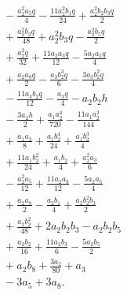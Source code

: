 \begin{align*}
&{}- \frac{a_{2}^{2} a_{5} q}{4} - \frac{11 a_{2}^{2} b_{1} q}{24} + \frac{a_{2}^{2} b_{2} b_{3} q}{2}\\
&{}+ \frac{a_{2}^{2} b_{2} q}{48} + a_{2}^{2} b_{3} q - \frac{a_{2}^{2} b_{5} q}{2}\\
&{}+ \frac{a_{2}^{2} q}{32} + \frac{11 a_{2} a_{3} q}{12} - \frac{5 a_{2} a_{5} q}{4}\\
&{}+ \frac{a_{2} a_{8} q}{2} - \frac{a_{3} b_{2}^{3} q}{6} - \frac{3 a_{3} b_{2}^{2} q}{4}\\
&{}- \frac{11 a_{3} b_{2} q}{12} - \frac{a_{3} q}{4} - a_{2} b_{2} h\\
&{}- \frac{3 a_{2} h}{2} + \frac{a_{1} a_{2}^{4}}{720} - \frac{11 a_{1} a_{2}^{2}}{144}\\
&{}+ \frac{a_{1} a_{2}}{8} + \frac{a_{1} b_{2}^{4}}{24} + \frac{a_{1} b_{2}^{3}}{4}\\
&{}+ \frac{11 a_{1} b_{2}^{2}}{24} + \frac{a_{1} b_{2}}{4} + \frac{a_{2}^{2} a_{3}}{6}\\
&{}- \frac{a_{2}^{2} a_{5}}{12} + \frac{11 a_{2} a_{3}}{12} - \frac{5 a_{2} a_{5}}{4}\\
&{}+ \frac{a_{2} a_{8}}{2} - \frac{a_{2} b_{1}}{4} + \frac{a_{2} b_{2}^{2} b_{3}}{2}\\
&{}+ \frac{a_{2} b_{2}^{2}}{48} + 2 a_{2} b_{2} b_{3} - a_{2} b_{2} b_{5}\\
&{}+ \frac{a_{2} b_{2}}{16} + \frac{11 a_{2} b_{3}}{6} - \frac{5 a_{2} b_{5}}{2}\\
&{}+ a_{2} b_{8} + \frac{3 a_{2}}{80} + a_{3}\\
&{}- 3 a_{5} + 3 a_{8}.
\end{align*}
\endgroup
